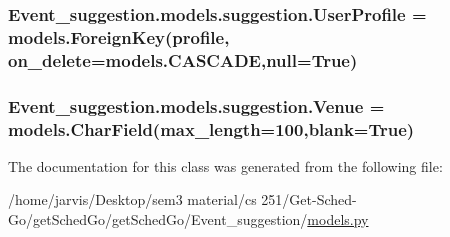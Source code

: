 \subsubsection[{\texorpdfstring{User\+Profile}{UserProfile}}]{\setlength{\rightskip}{0pt plus 5cm}Event\+\_\+suggestion.\+models.\+suggestion.\+User\+Profile = models.\+Foreign\+Key({\bf profile}, on\+\_\+delete=models.\+C\+A\+S\+C\+A\+DE,null=True)\hspace{0.3cm}{\ttfamily [static]}}\hypertarget{classEvent__suggestion_1_1models_1_1suggestion_a34732a8136fe27e916a4934316defe02}{}\label{classEvent__suggestion_1_1models_1_1suggestion_a34732a8136fe27e916a4934316defe02}
\subsubsection[{\texorpdfstring{Venue}{Venue}}]{\setlength{\rightskip}{0pt plus 5cm}Event\+\_\+suggestion.\+models.\+suggestion.\+Venue = models.\+Char\+Field(max\+\_\+length=100,blank=True)\hspace{0.3cm}{\ttfamily [static]}}\hypertarget{classEvent__suggestion_1_1models_1_1suggestion_ac58ac02dd8e5811f0b21ff58ffc4954d}{}\label{classEvent__suggestion_1_1models_1_1suggestion_ac58ac02dd8e5811f0b21ff58ffc4954d}


The documentation for this class was generated from the following file\+:\begin{DoxyCompactItemize}
\item 
/home/jarvis/\+Desktop/sem3 material/cs 251/\+Get-\/\+Sched-\/\+Go/get\+Sched\+Go/get\+Sched\+Go/\+Event\+\_\+suggestion/\hyperlink{Event__suggestion_2models_8py}{models.\+py}\end{DoxyCompactItemize}
